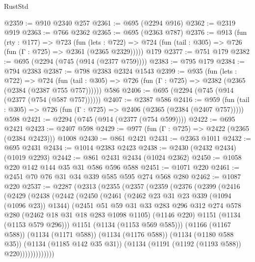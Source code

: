 \begin{lexlean}{RustStd}
\begin{coremodule}
@2359 := @910 @2340 @257
@2361 := @695 (@2294 @916)
@2362 := @2319 @919
@2363 := @766 @2362
@2365 := @695 (@2363 @787)
@2376 := @913
    (fun (rty : @177) =>
    @723
      (fun (lets : @722) =>
      @724 (fun (tail : @305) => @726 (fun (Γ : @725) => @2361 (@2365 @2329)))))
    @179
@2377 := @751 @179
@2382 := @695 (@2294 (@745 (@914 (@2377 @759))))
@2383 := @795 @179
@2384 := @794 @2383
@2387 := @798 @2383 @2324 @1543
@2399 := @935
    (fun (lets : @722) =>
    @724 (fun (tail : @305) => @726 (fun (Γ : @725) => @2382 (@2365 (@2384 (@2387 @755 @757))))))
    @586
@2406 := @695 (@2294 (@745 (@914 (@2377 (@754 (@587 @757))))))
@2407 := @2387 @586
@2416 := @959
    (fun (tail : @305) => @726 (fun (Γ : @725) => @2406 (@2365 (@2384 (@2407 @757)))))
    @598
@2421 := @2294 (@745 (@914 (@2377 (@754 @599))))
@2422 := @695 @2421
@2423 := @2407 @598
@2429 := @977 (fun (Γ : @725) => @2422 (@2365 (@2384 @2423))) @1008
@2430 := @861 @2421
@2431 := @2363 @1011
@2432 := @695 @2431
@2434 := @1014 @2383 @2423
@2438 := @2430 (@2432 @2434) (@1019 @2293)
@2442 := @861 @2431 @2434 (@1024 @2362)
@2450 := @1058 @220 @142 @144 @35 @31 @586 @596 @588
@2451 := @1071 @220
@2461 := @2451 @70 @76 @31 @34 @339 @585 @595 @274 @568 @280
@2462 := @1087 @220
@2537 := @2287
    (@2313
      (@2355
        (@2357
          (@2359
            (@2376
              (@2399
                (@2416
                  (@2429
                    (@2438
                      (@2442
                        (@2450
                          (@2461
                            (@2462 @23 @31 @23 @339 (@1094 (@1096 @23)) @1344)
                            (@2451
                              @51
                              @59
                              @31
                              @33
                              @283
                              @296
                              @312
                              @274
                              @578
                              @280
                              (@2462 @18 @31 @18 @283 @1098 @1105)
                              (@1146 @220)
                              @1151
                              (@1134 (@1153 @579 @296)))
                            @1151
                            (@1134 (@1153 @569 @585)))
                          (@1166 (@1167 @588))
                          (@1134 (@1171 @588))
                          (@1134 (@1176 @588))
                          (@1134 (@1180 @588 @35))
                          (@1134 (@1185 @142 @35 @31))
                          (@1134 (@1191 (@1192 (@1193 @588)) @220)))))))))))))

\end{coremodule}
\end{lexlean}
